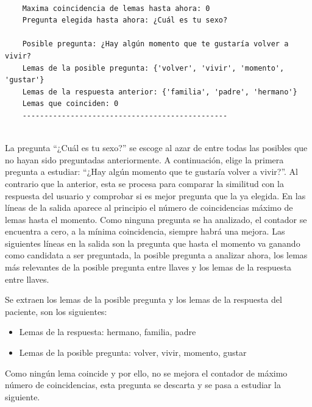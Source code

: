 \begin{verbatim}
	
	Maxima coincidencia de lemas hasta ahora: 0
	Pregunta elegida hasta ahora: ¿Cuál es tu sexo?
	
	Posible pregunta: ¿Hay algún momento que te gustaría volver a vivir?
	Lemas de la posible pregunta: {'volver', 'vivir', 'momento', 'gustar'}
	Lemas de la respuesta anterior: {'familia', 'padre', 'hermano'}
	Lemas que coinciden: 0
	-----------------------------------------------
	
\end{verbatim}

La pregunta ``¿Cuál es tu sexo?'' se escoge al azar de entre todas las posibles que no hayan sido preguntadas anteriormente. A continuación, elige la primera pregunta a estudiar: ``¿Hay algún momento que te gustaría volver a vivir?''. Al contrario que la anterior, esta se procesa para comparar la similitud con la respuesta del usuario y comprobar si es mejor pregunta que la ya elegida. En las líneas de la salida aparece al principio el número de coincidencias máximo de lemas hasta el momento. Como ninguna pregunta se ha analizado, el contador se encuentra a cero, a la mínima coincidencia, siempre habrá una mejora. Las siguientes líneas en la salida son la pregunta que hasta el momento va ganando como candidata a ser preguntada, la posible pregunta a analizar ahora, los lemas más relevantes de la posible pregunta entre llaves y los lemas de la respuesta entre llaves.

Se extraen los lemas de la posible pregunta y los lemas de la respuesta del paciente, son los siguientes: 

\begin{itemize}
	\item[] Lemas de la respuesta: \hspace{2cm} hermano, familia, padre
	\item[] Lemas de la posible pregunta: \hspace{0.8cm} volver, vivir, momento, gustar
\end{itemize}

Como ningún lema coincide y por ello, no se mejora el contador de máximo número de coincidencias, esta pregunta se descarta y se pasa a estudiar la siguiente.

